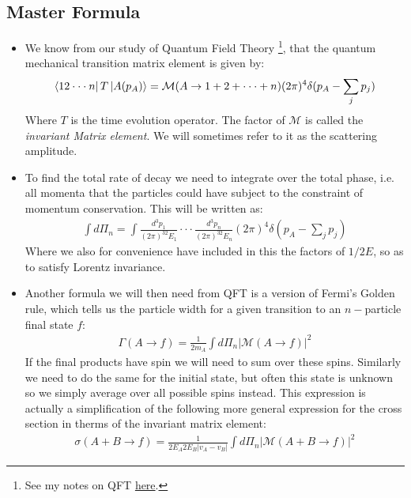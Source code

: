 \documentclass[11pt]{article}
\numberwithin{equation}{section}
\begin{document}
 \subsection{Master Formula} %
 \label{sub:master_formula}
 \begin{itemize}
     \item We know from our study of Quantum Field Theory \footnote{See my notes on QFT \href{https://tbrosnan12.github.io/documents/Fourth_year/First_semester/Quantum_Field_Theory_I.pdf}{here}.}, that the quantum mechanical transition matrix element is given by:
     \begin{align}
     \label{T_hat}
         \bra{12 \cdot \cdot \cdot n}T \ket{A(p_A)} = \mathcal{M}(A \rightarrow 1 +2 + \cdot \cdot \cdot+ n)(2\pi)^4\delta(p_A - \sum_jp_j)
     \end{align}
     Where $T$ is the time evolution operator. The factor of $\mathcal{M}$ is called the \emph{invariant Matrix element}. We will sometimes refer to it as the scattering amplitude. 
     \item To find the total rate of decay we need to integrate over the total phase, i.e. all momenta that the particles could have subject to the constraint of momentum conservation. This will be written as:
     \begin{align*}
          \int d\Pi_n = \int \frac{d^3p_1}{(2\pi)^32E_1} \cdot \cdot \cdot \frac{d^3p_n}{(2\pi)^32E_n}(2\pi)^4\delta(p_A - \sum_jp_j)
      \end{align*} 
Where we also for convenience have included in this the factors of $1/2E$, so as to satisfy Lorentz invariance.
\item Another formula we will then need from QFT is a version of Fermi's Golden rule, which tells us the particle width for a given transition to an $n-$particle final state $f$:
\begin{align*}
    \Gamma(A \rightarrow f) = \frac{1}{2m_A}\int d\Pi_n|\mathcal{M}(A\rightarrow f)|^2
\end{align*}
If the final products have spin we will need to sum over these spins. Similarly we need to do the same for the initial state, but often this state is unknown so we simply average over all possible spins instead. This expression is actually a simplification of the following more general expression for the cross section in therms of the invariant matrix element:
\begin{align}
\label{cross}
    \sigma(A+B \rightarrow f) = \frac{1}{2E_A2E_B|v_A-v_B|}\int d\Pi_n|\mathcal{M}(A+B\rightarrow f)|^2
\end{align}

 \end{itemize}
\end{document}
